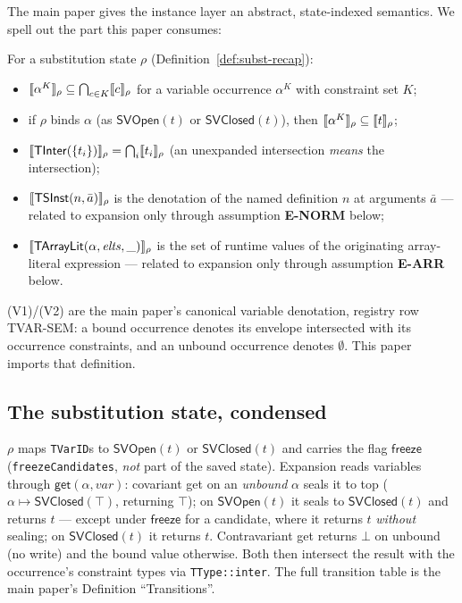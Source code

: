 \documentclass[11pt]{article}
\newcommand{\SVOpen}{\mathsf{SVOpen}}
\newcommand{\SVClosed}{\mathsf{SVClosed}}
\newcommand{\getop}{\mathsf{get}}
\begin{document}
The main paper gives the instance layer an abstract, state-indexed
semantics. We spell out the part this paper consumes:

\begin{definition}
\label{def:inst-sem}
For a substitution state $\rho$ (Definition~\ref{def:subst-recap}):
\begin{itemize}
\item[(V1)] $\llbracket \alpha^K \rrbracket_\rho \subseteq \bigcap_{c \in K}\llbracket c \rrbracket_\rho$
  for a variable occurrence $\alpha^K$ with constraint set $K$;
\item[(V2)] if $\rho$ binds $\alpha$ (as $\SVOpen(t)$ or $\SVClosed(t)$),
  then $\llbracket \alpha^K \rrbracket_\rho \subseteq \llbracket t \rrbracket_\rho$;
\item[(I1)] $\llbracket \mathsf{TInter}(\{t_i\}) \rrbracket_\rho =
  \bigcap_i \llbracket t_i \rrbracket_\rho$ (an unexpanded intersection \emph{means} the
  intersection);
\item[(N1)] $\llbracket \mathsf{TSInst}(n,\bar{a}) \rrbracket_\rho$ is the denotation of
  the named definition $n$ at arguments $\bar{a}$ — related to expansion
  only through assumption \textbf{E-NORM} below;
\item[(A1)] $\llbracket \mathsf{TArrayLit}(\alpha,\mathit{elts},\_) \rrbracket_\rho$ is
  the set of runtime values of the originating array-literal expression —
  related to expansion only through assumption \textbf{E-ARR} below.
\end{itemize}
(V1)/(V2) are the main paper's canonical variable denotation, registry row
TVAR-SEM: a bound occurrence denotes its envelope intersected with its
occurrence constraints, and an unbound occurrence denotes $\emptyset$.
This paper imports that definition.
\end{definition}

\subsection{The substitution state, condensed}
\label{sec:subst-recap}

\begin{definition}
\label{def:subst-recap}
$\rho$ maps \texttt{TVarID}s to $\SVOpen(t)$ or $\SVClosed(t)$ and carries
the flag $\mathsf{freeze}$ (\texttt{freezeCandidates}, \emph{not} part of
the saved state). Expansion reads variables through
$\getop(\alpha, \mathit{var})$:
covariant get on an \emph{unbound} $\alpha$ seals it to top
($\alpha \mapsto \SVClosed(\top)$, returning $\top$); on $\SVOpen(t)$ it
seals to $\SVClosed(t)$ and returns $t$ — except under $\mathsf{freeze}$
for a candidate, where it returns $t$ \emph{without} sealing; on
$\SVClosed(t)$ it returns $t$. Contravariant get returns $\bot$ on
unbound (no write) and the bound value otherwise. Both then intersect the
result with the occurrence's constraint types via \texttt{TType::inter}.
The full transition table is the main paper's Definition
``Transitions''.
\end{definition}
\end{document}
